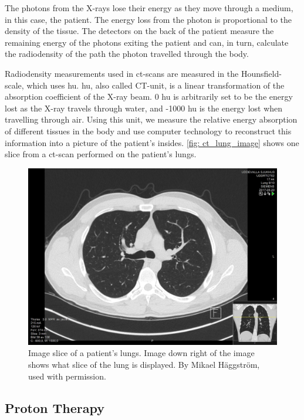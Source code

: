 \documentclass[main.tex]{subfiles}
\begin{document}
The photons from the X-rays lose their energy as they move through a medium, in this case, the patient. The energy loss from the photon is proportional to the density of the tissue. The detectors on the back of the patient measure the remaining energy of the photons exiting the patient and can, in turn, calculate the radiodensity of the path the photon travelled through the body.

Radiodensity measurements used in \gls{ct}-scans are measured in the Hounsfield-scale, which uses \gls{hu}. \gls{hu}, also called CT-unit, is a linear transformation of the absorption coefficient of the X-ray beam. 0 \gls{hu} is arbitrarily set to be the energy lost as the X-ray travels through water, and -1000 \gls{hu} is the energy lost when travelling through air. Using this unit, we measure the relative energy absorption of different tissues in the body and use computer technology to reconstruct this information into a picture of the patient's insides. \autoref{fig: ct_lung_image} shows one slice from a \gls{ct}-scan performed on the patient's lungs.


 \begin{figure}[!htpb]
    \centering
    \includegraphics[width=12cm ]{images/High-resolution_computed_tomograph_of_a_normal_thorax,_axial_plane_(38).jpg}
    \caption{Image slice of a patient's lungs. Image down right of the image shows what slice of the lung is displayed. By Mikael Häggström, used with permission.}
    \label{fig: ct_lung_image}
\end{figure}
\FloatBarrier 


\subsection{Proton Therapy}
\end{document}
